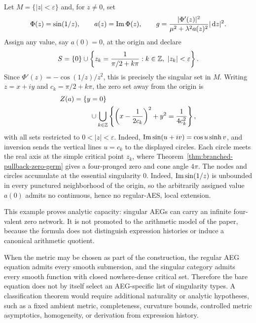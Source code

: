 \begin{example}
\label{ex:sin-essential-zero-network}
Let $M=\{|z|<\varepsilon\}$ and, for $z\ne0$, set
\[
 \Phi(z)=\sin(1/z),
 \qquad a(z)=\operatorname{Im}\Phi(z),
 \qquad
 g=\frac{|\Phi'(z)|^2}{\mu^2+\lambda^2a(z)^2}|\,\mathrm{d} z|^2.
\]
Assign any value, say $a(0)=0$, at the origin and declare
\[
 S=\{0\}\cup
 \left\{z_k=\frac1{\pi/2+k\pi}:k\in\Z,\ |z_k|<\varepsilon\right\}.
\]
Since $\Phi'(z)=-\cos(1/z)/z^2$, this is precisely the singular set in $M$.
Writing $z=x+iy$ and $c_k=\pi/2+k\pi$, the zero set away from the origin is
\begin{align}
 Z(a)={}&\{y=0\}\notag\\
 &\quad\cup\bigcup_{k\in\mathbb{Z}}
 \left\{
   \left(x-\frac1{2c_k}\right)^2+y^2=\frac1{4c_k^2}
 \right\},
 \label{eq:sin-essential-zero-network}
\end{align}
with all sets restricted to $0<|z|<\varepsilon$.
Indeed,
$\operatorname{Im}\sin(u+iv)=\cos u\sinh v$, and inversion sends the vertical lines
$u=c_k$ to the displayed circles.  Each circle meets the real axis at the simple
critical point $z_k$, where Theorem~\ref{thm:branched-pullback-zero-germ} gives a
four-pronged zero and cone angle $4\pi$.  The nodes and circles accumulate at the
essential singularity $0$.  Indeed, $\operatorname{Im}\sin(1/z)$ is unbounded in every punctured
neighborhood of the origin, so the arbitrarily assigned value $a(0)$ admits no
continuous, hence no regular-AES, local extension.

This example proves analytic capacity: singular AEGs can carry an infinite
four-valent zero network.  It is not promoted to the arithmetic model of the
paper, because the formula does not distinguish expression histories or induce a
canonical arithmetic quotient.
\end{example}

\begin{warning}
\label{warn:flexibility}
When the metric may be chosen as part of the construction, the regular AEG
equation admits every smooth submersion, and the singular category admits every
smooth function with closed nowhere-dense critical set.  Therefore the bare
equation does not by itself select an AEG-specific list of singularity types.
A classification theorem would require additional naturality or analytic
hypotheses, such as a fixed ambient metric, completeness, curvature bounds,
controlled metric asymptotics, homogeneity, or derivation from expression history.
\end{warning}


